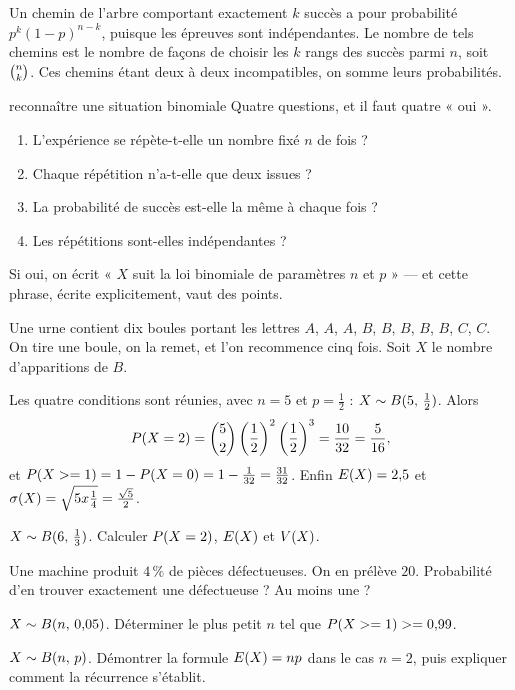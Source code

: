 \begin{demonstration}
Un chemin de l'arbre comportant exactement $k$ succès a pour probabilité
$p^{k}(1-p)^{n-k}$, puisque les épreuves sont indépendantes. Le nombre de tels
chemins est le nombre de façons de choisir les $k$ rangs des succès parmi $n$,
soit $\combi{k}{n}$. Ces chemins étant deux à deux incompatibles, on somme
leurs probabilités.
\end{demonstration}

\begin{methode}{reconnaître une situation binomiale}
Quatre questions, et il faut quatre « oui ».
\begin{enumerate}[label=\textbf{\arabic*.}, leftmargin=*, itemsep=0.15em]
  \item L'expérience se répète-t-elle un nombre fixé $n$ de fois ?
  \item Chaque répétition n'a-t-elle que deux issues ?
  \item La probabilité de succès est-elle la même à chaque fois ?
  \item Les répétitions sont-elles indépendantes ?
\end{enumerate}
Si oui, on écrit « $X$ suit la loi binomiale de paramètres $n$ et $p$ » — et
cette phrase, écrite explicitement, vaut des points.
\end{methode}

\begin{exemple}
Une urne contient dix boules portant les lettres $A$, $A$, $A$, $B$, $B$,
$B$, $B$, $B$, $C$, $C$. On tire une boule, on la remet, et l'on recommence
cinq fois. Soit $X$ le nombre d'apparitions de $B$.

Les quatre conditions sont réunies, avec $n = 5$ et $p = \frac12$ :
$X \sim \loibin{5}{\frac12}$. Alors
\[
  \proba{X = 2} = \combi{2}{5}\left(\frac12\right)^{2}
  \left(\frac12\right)^{3} = \frac{10}{32} = \frac{5}{16},
\]
et $\proba{X \geq 1} = 1-\proba{X = 0} = 1-\frac{1}{32} = \frac{31}{32}$.
Enfin $\Esp(X) = 2{,}5$ et $\ecart(X) = \sqrt{5 \times \frac14}
= \frac{\sqrt5}{2}$.
\end{exemple}

\begin{entrainement}
\exo[\niveau{1}] $X \sim \loibin{6}{\frac13}$. Calculer $\proba{X = 2}$,
$\Esp(X)$ et $\Var(X)$.

\exo[\niveau{2}] Une machine produit $4\,\%$ de pièces défectueuses. On en
prélève $20$. Probabilité d'en trouver exactement une défectueuse ? Au moins
une ?

\exo[\niveau{2}] $X \sim \loibin{n}{0{,}05}$. Déterminer le plus petit $n$ tel
que $\proba{X \geq 1} \geq 0{,}99$.

\exo[\niveau{3}] $X \sim \loibin{n}{p}$. Démontrer la formule
$\Esp(X) = np$ dans le cas $n = 2$, puis expliquer comment la récurrence
s'établit.
\end{entrainement}

